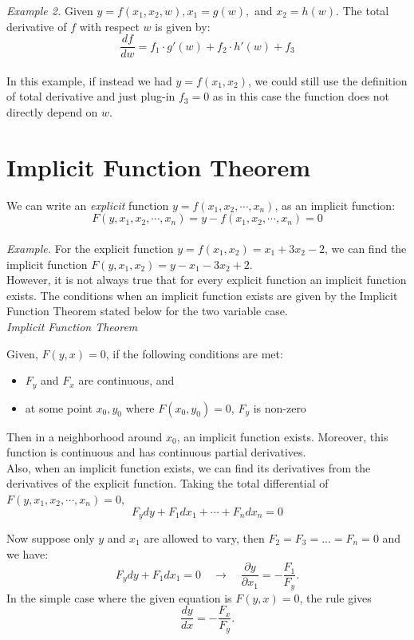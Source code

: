 \documentclass{./../Latex/handout}
\begin{document}
\textit{Example 2.} Given $y=f\left(x_{1}, x_{2}, w\right), x_{1}=g(w),$ and $x_{2}=h(w)$. The total derivative of $f$ with respect $w$ is given by:
\[ \frac{d f}{d w} = f_1 \cdot g'(w) +f_2 \cdot h'(w)  + f_3 \] \\
In this example, if instead we had $y=f(x_1, x_2)$, we could still use the definition of total derivative and just plug-in $f_3=0$ as in this case the function does not directly depend on $w$. 

\section*{Implicit Function Theorem}

We can write an \textit{explicit} function $y=f\left(x_{1}, x_{2}, \cdots, x_{n}\right)$, as an implicit function:
\[F\left(y, x_{1}, x_{2}, \cdots, x_{n}\right)=y-f\left(x_{1}, x_{2}, \cdots, x_{n}\right)=0\] \\
\textit{Example.} For the explicit function $y = f (x_1, x_2) = x_1+3x_2-2$, we can find the implicit function $F(y, x_1, x_2) = y-x_1 -3x_2+2.$\\

However, it is not always true that for every explicit function an implicit function exists. The conditions when an implicit function exists are given by the Implicit Function Theorem stated below for the two variable case. \\

\textit{Implicit Function Theorem}

Given, $F\left(y, x \right)=0$, if the following conditions are met:
\begin{itemize}
  \item $F_y$ and $F_x$ are continuous, and
  \item at some point $x_0, y_0$ where $F(x_0,y_0) = 0$, $F_y$ is non-zero 
\end{itemize}
Then in a neighborhood around $x_0$, an implicit function exists. Moreover, this function is continuous and has continuous partial derivatives. \\

Also, when an implicit function exists, we can find its derivatives from the derivatives of the explicit function. Taking the total differential of $F\left(y, x_{1}, x_{2}, \cdots, x_{n}\right)=0$,
$$
F_{y} d y+F_{1} d x_{1}+\cdots+F_{n} d x_{n}=0 
$$

\vspace{1em}
Now suppose only $y$ and $x_{1}$ are allowed to vary, then $F_2=F_3=...=F_n=0$ and we have:
$$
F_{y} d y+F_{1} d x_{1} = 0 \quad \rightarrow \quad \frac{\partial y}{\partial x_{1}}=-\frac{F_{1}}{F_{y}} .
$$
In the simple case where the given equation is $F(y, x)=0$, the rule gives
$$
\frac{d y}{d x}=-\frac{F_{x}}{F_{y}} .
$$
\end{document}

